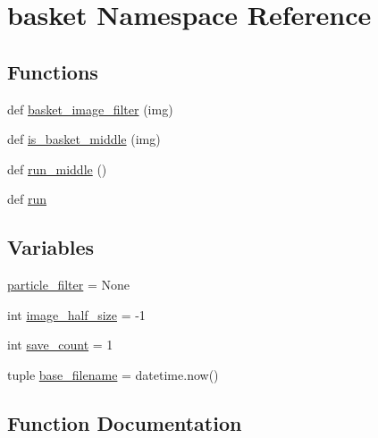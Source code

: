 \hypertarget{namespacebasket}{}\section{basket Namespace Reference}
\label{namespacebasket}
\subsection*{Functions}
\begin{DoxyCompactItemize}
\item 
def \hyperlink{namespacebasket_a10ccc2b8542cee4a0e124537a4ca7108}{basket\+\_\+image\+\_\+filter} (img)
\item 
def \hyperlink{namespacebasket_a6244ca5fd7cf7706c81e45e270087d17}{is\+\_\+basket\+\_\+middle} (img)
\item 
def \hyperlink{namespacebasket_a0cb50ef447247bf29a40cbdfcd275bc0}{run\+\_\+middle} ()
\item 
def \hyperlink{namespacebasket_a00c6a996da6d264c30c7b6c710cacddc}{run}
\end{DoxyCompactItemize}
\subsection*{Variables}
\begin{DoxyCompactItemize}
\item 
\hyperlink{namespacebasket_ae8e523df739d65470eb5eba16867f329}{particle\+\_\+filter} = None
\item 
int \hyperlink{namespacebasket_a3c352b285b29250f904de2d4ad7fddaa}{image\+\_\+half\+\_\+size} = -\/1
\item 
int \hyperlink{namespacebasket_a3d020674941ec4faf6734391ca082c40}{save\+\_\+count} = 1
\item 
tuple \hyperlink{namespacebasket_aa3007fa12430ca814f5bf5890bb2fb0f}{base\+\_\+filename} = datetime.\+now()
\end{DoxyCompactItemize}


\subsection{Function Documentation}
\hypertarget{namespacebasket_a10ccc2b8542cee4a0e124537a4ca7108}{}
